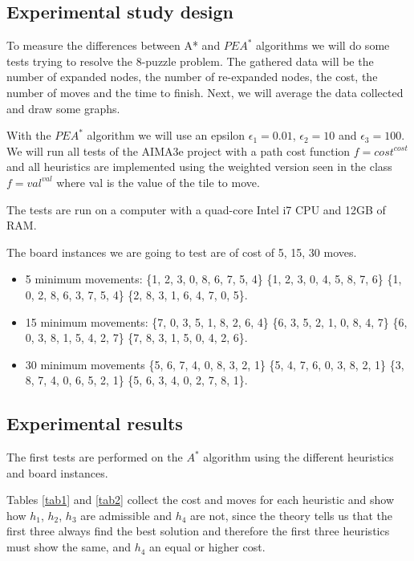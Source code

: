 \documentclass[runningheads]{llncs}
\begin{document}
\subsection{Experimental study design}
To measure the differences between A* and \(PEA^*\) algorithms we will do some tests trying to resolve the  8-puzzle problem.
The gathered data  will be the number of expanded nodes, the number of re-expanded nodes, the cost, the number of moves and the time to finish. Next, we will average the data collected and draw some graphs.

With the \(PEA^*\) algorithm we will use an epsilon $\epsilon_1=0.01$, $\epsilon_2=10$ and $\epsilon_3=100$.
We will run all tests of the AIMA3e project with a path cost function $f={cost}^{cost}$ and 
all heuristics are implemented using the weighted version seen in the class $f={val}^{val}$ 
where val is the value of the tile to move.

The tests are run on a computer with a quad-core Intel i7 CPU and 12GB of RAM.

The board instances we are going to test are of cost of 5, 15, 30 moves.

\begin{itemize}
    \item 5 minimum movements: 
        \{1, 2, 3, 0, 8, 6, 7, 5, 4\}
        \{1, 2, 3, 0, 4, 5, 8, 7, 6\}
        \{1, 0, 2, 8, 6, 3, 7, 5, 4\}
        \{2, 8, 3, 1, 6, 4, 7, 0, 5\}.

    \item 15 minimum movements: 
        \{7, 0, 3, 5, 1, 8, 2, 6, 4\}
        \{6, 3, 5, 2, 1, 0, 8, 4, 7\}
        \{6, 0, 3, 8, 1, 5, 4, 2, 7\}
        \{7, 8, 3, 1, 5, 0, 4, 2, 6\}.

\item 30 minimum movements
        \{5, 6, 7, 4, 0, 8, 3, 2, 1\}
        \{5, 4, 7, 6, 0, 3, 8, 2, 1\} 
        \{3, 8, 7, 4, 0, 6, 5, 2, 1\}
        \{5, 6, 3, 4, 0, 2, 7, 8, 1\}.
\end{itemize}
\subsection{Experimental results}
The first tests are performed on the \(A^*\) algorithm using the different heuristics and board instances.

Tables \ref{tab1} and \ref{tab2} collect the cost and moves for each heuristic and show how $h_1$, $h_2$, $h_3$ are admissible and $h_4$ are not,
since the theory tells us that the first three always find the best solution and therefore the first three heuristics must show the same, and $h_4$ an equal or higher cost.
\end{document}
